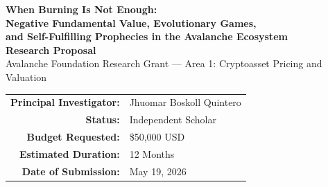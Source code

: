 \documentclass[11pt,a4paper]{article}
\begin{document}
\begin{center}
{\LARGE\bfseries\color{primary} When Burning Is Not Enough:\\[4pt]
Negative Fundamental Value, Evolutionary Games,\\
and Self-Fulfilling Prophecies in the Avalanche Ecosystem}\\[10pt]
{\large\textbf{Research Proposal}}\\[4pt]
{\normalsize Avalanche Foundation Research Grant --- Area 1: Cryptoasset Pricing and Valuation}\\[10pt]
\begin{tabular}{rl}
\textbf{Principal Investigator:} & Jhuomar Boskoll Quintero\\
\textbf{Status:} & Independent Scholar\\
\textbf{Budget Requested:} & \$50,000 USD\\
\textbf{Estimated Duration:} & 12 Months\\
\textbf{Date of Submission:} & May 19, 2026
\end{tabular}
\end{center}

\vspace{0.4cm}

\begin{abstract}
\noindent Existing cryptoasset valuation frameworks assume that deflationary mechanisms---token burns and emission reductions---generate sustainable upward pressure on fundamental value. This proposal challenges that premise. In proof-of-stake networks like Avalanche---with heterogeneous subnet architectures and persistent validation costs---the net fundamental value (NFV) of AVAX can be zero or negative even as the market price remains positive. This decoupling arises from three dynamics absent from current models: (1) \emph{rent dissipation}, where token issuance acts as an inflationary tax; (2) \emph{evolutionary games}, where validator strategies produce multiple equilibria; and (3) \emph{self-referential expectations}, where price anchors on social contagion rather than fundamentals. We propose the \textbf{MV4E2} model integrating all three mechanisms. Agent-based simulation reveals that NFV crosses zero at $E^* \approx 1.31\%$ annual emission, yet price remains elevated (\$1.12 at 1.5\% emission) through expectation contagion---a regime we term \textbf{Sustained Self-Referential Expectation Equilibrium (SSREE)}. At the critical contagion threshold $\Omega^* \approx 0.58$, this equilibrium collapses to the fundamental value.
\end{abstract}
\end{document}
